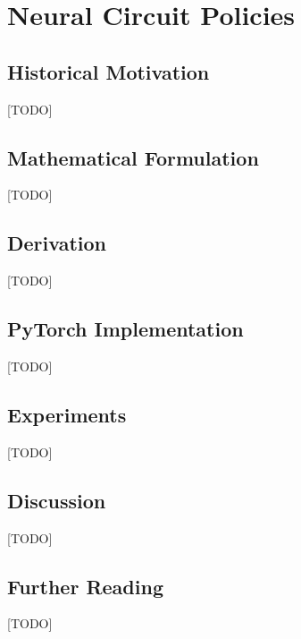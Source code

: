 
\chapter{Neural Circuit Policies}
\label{ch:06_ncp}


\section{Historical Motivation}
[TODO]

\section{Mathematical Formulation}
[TODO]

\section{Derivation}
[TODO]

\section{PyTorch Implementation}
[TODO]

\section{Experiments}
[TODO]

\section{Discussion}
[TODO]

\section{Further Reading}
[TODO]

